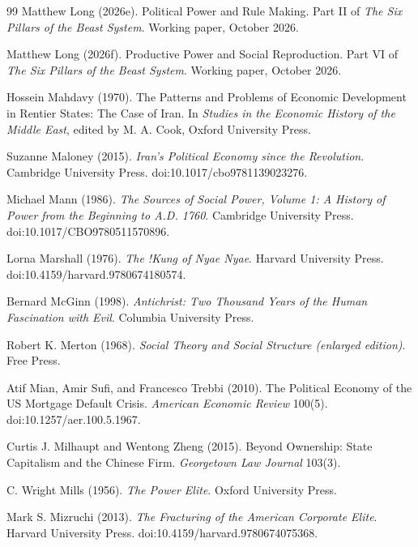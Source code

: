\documentclass[11pt,letterpaper]{article}
\theoremstyle{definition}
\theoremstyle{remark}
\begin{document}
\begin{thebibliography}{99}
Matthew Long (2026e). Political Power and Rule Making. Part II of \emph{The Six Pillars of the Beast System}. Working paper, October 2026.

Matthew Long (2026f). Productive Power and Social Reproduction. Part VI of \emph{The Six Pillars of the Beast System}. Working paper, October 2026.

Hossein Mahdavy (1970). The Patterns and Problems of Economic Development in Rentier States: The Case of Iran. In \emph{Studies in the Economic History of the Middle East}, edited by M. A. Cook, Oxford University Press.

Suzanne Maloney (2015). \emph{Iran's Political Economy since the Revolution}. Cambridge University Press. doi:10.1017/cbo9781139023276.

Michael Mann (1986). \emph{The Sources of Social Power, Volume 1: A History of Power from the Beginning to A.D. 1760}. Cambridge University Press. doi:10.1017/CBO9780511570896.

Lorna Marshall (1976). \emph{The !Kung of Nyae Nyae}. Harvard University Press. doi:10.4159/harvard.9780674180574.

Bernard McGinn (1998). \emph{Antichrist: Two Thousand Years of the Human Fascination with Evil}. Columbia University Press.

Robert K. Merton (1968). \emph{Social Theory and Social Structure (enlarged edition)}. Free Press.

Atif Mian, Amir Sufi, and Francesco Trebbi (2010). The Political Economy of the US Mortgage Default Crisis. \emph{American Economic Review} 100(5). doi:10.1257/aer.100.5.1967.

Curtis J. Milhaupt and Wentong Zheng (2015). Beyond Ownership: State Capitalism and the Chinese Firm. \emph{Georgetown Law Journal} 103(3).

C. Wright Mills (1956). \emph{The Power Elite}. Oxford University Press.

Mark S. Mizruchi (2013). \emph{The Fracturing of the American Corporate Elite}. Harvard University Press. doi:10.4159/harvard.9780674075368.


\end{thebibliography}
\end{document}
